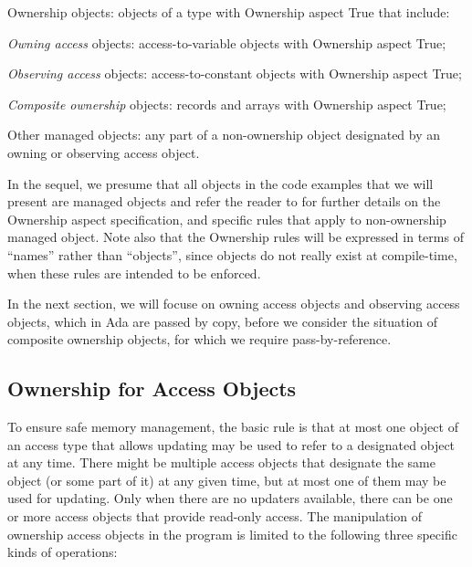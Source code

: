\documentclass{llncs}
\begin{document}
\begin{compactitem}
\item Ownership objects: objects of a type with Ownership aspect True that include:
    \begin{compactitem}
\item \textit{Owning access} objects: access-to-variable objects with Ownership aspect True;
\item \textit{Observing access} objects: access-to-constant objects with Ownership aspect True;
\item \textit{Composite ownership} objects: records and arrays with Ownership aspect True;
    \end{compactitem}
\item Other managed objects: any part of a non-ownership object designated by an owning or observing access object.
\end{compactitem}

\smallskip
In the sequel, we presume that all objects in the code examples that we will present are managed objects and refer the reader to \cite{AI2017} for further details on
the Ownership aspect specification, and specific rules that apply to non-ownership managed object. Note also that the Ownership rules will be expressed in terms
of ``names'' rather than ``objects'', since objects do not really exist at compile-time, when these rules are intended to be enforced. 

\smallskip
In the next section, we will focuse on owning access objects and observing access objects, which in Ada are passed by copy, before we
consider the situation of composite ownership objects, for which we require pass-by-reference.


\subsection{Ownership for Access Objects}
\label{subsec:ownershipAccess}

To ensure safe memory management, the basic rule is that at most one object of an access type that allows updating may be used to refer to a designated object at any time.  There might be multiple access objects that designate the same object (or some part of it) at any given time, but at most one of them may be used for updating.  Only when there are no updaters available, there can be one or more access objects that provide read-only access. The manipulation of ownership access objects in the program is limited to the following three specific kinds of operations:
\end{document}
